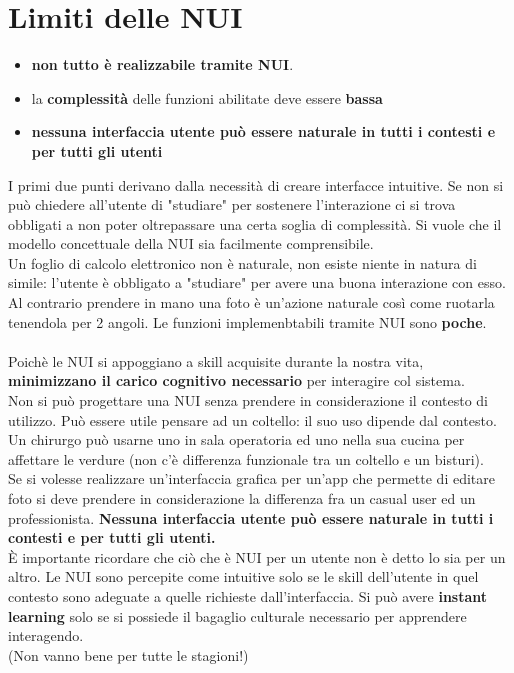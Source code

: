 \section{Limiti delle NUI}
\begin{itemize}
\item \textbf{non tutto è realizzabile tramite NUI}. 
\item la \textbf{complessità} delle funzioni abilitate deve essere \textbf{bassa}
\item \textbf{nessuna interfaccia utente può essere naturale in tutti i contesti  e per tutti gli utenti}
\end{itemize}
I primi due punti derivano dalla necessità di creare interfacce intuitive. Se non si può chiedere all'utente di "studiare" per sostenere l'interazione ci si trova obbligati a non poter oltrepassare una certa soglia di complessità. Si vuole che il modello concettuale della NUI sia facilmente comprensibile.\\
Un foglio di calcolo elettronico non è naturale, non esiste niente in natura di simile: l'utente è obbligato a "studiare" per avere una buona interazione con esso.\\
Al contrario prendere in mano una foto è un'azione naturale così come ruotarla tenendola per 2 angoli.
Le funzioni implemenbtabili tramite NUI sono \textbf{poche}.\\
\\Poichè le NUI si appoggiano a skill acquisite durante la nostra vita, \textbf{minimizzano il carico cognitivo necessario }per interagire col sistema.\\
Non si può progettare una NUI senza prendere in considerazione il contesto di utilizzo. Può essere utile pensare ad un coltello: il suo uso dipende dal contesto. Un chirurgo può usarne uno in sala operatoria ed uno nella sua cucina per affettare le verdure (non c'è differenza funzionale tra un coltello e un bisturi). \\Se si volesse realizzare un'interfaccia grafica per un'app che permette di editare foto si deve prendere in considerazione la differenza fra un casual user ed un professionista.
\textbf{Nessuna interfaccia utente può essere naturale in tutti i contesti  e per tutti gli utenti.}\\
È importante ricordare che ciò che è NUI per un utente non è detto lo sia per un altro. Le NUI sono percepite come intuitive solo se le skill dell'utente in quel contesto sono adeguate a quelle richieste dall'interfaccia.
Si può avere \textbf{instant learning }solo se si possiede il bagaglio culturale necessario per apprendere interagendo.\\
(Non vanno bene per tutte le stagioni!)\\

